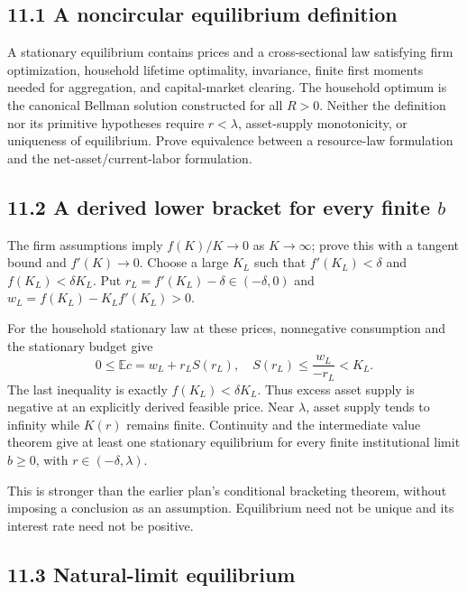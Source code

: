 \documentclass[
  11pt,
]{article}
\begin{document}
\subsection{11.1 A noncircular equilibrium
definition}\label{a-noncircular-equilibrium-definition}

A stationary equilibrium contains prices and a cross-sectional law
satisfying firm optimization, household lifetime optimality, invariance,
finite first moments needed for aggregation, and capital-market
clearing. The household optimum is the canonical Bellman solution
constructed for all \(R>0\). Neither the definition nor its primitive
hypotheses require \(r<\lambda\), asset-supply monotonicity, or
uniqueness of equilibrium. Prove equivalence between a resource-law
formulation and the net-asset/current-labor formulation.

\subsection{\texorpdfstring{11.2 A derived lower bracket for every
finite
\(b\)}{11.2 A derived lower bracket for every finite b}}\label{a-derived-lower-bracket-for-every-finite-b}

The firm assumptions imply \(f(K)/K\to0\) as \(K\to\infty\); prove this
with a tangent bound and \(f'(K)\to0\). Choose a large \(K_L\) such that
\(f'(K_L)<\delta\) and \(f(K_L)<\delta K_L\). Put
\(r_L=f'(K_L)-\delta\in(-\delta,0)\) and \(w_L=f(K_L)-K_Lf'(K_L)>0\).

For the household stationary law at these prices, nonnegative
consumption and the stationary budget give \[
0\leq\mathbb Ec=w_L+r_LS(r_L),
\quad S(r_L)\leq\frac{w_L}{-r_L}<K_L.
\] The last inequality is exactly \(f(K_L)<\delta K_L\). Thus excess
asset supply is negative at an explicitly derived feasible price. Near
\(\lambda\), asset supply tends to infinity while \(K(r)\) remains
finite. Continuity and the intermediate value theorem give at least one
stationary equilibrium for every finite institutional limit \(b\geq0\),
with \(r\in(-\delta,\lambda)\).

This is stronger than the earlier plan's conditional bracketing theorem,
without imposing a conclusion as an assumption. Equilibrium need not be
unique and its interest rate need not be positive.

\subsection{11.3 Natural-limit
equilibrium}\label{natural-limit-equilibrium}
\end{document}
